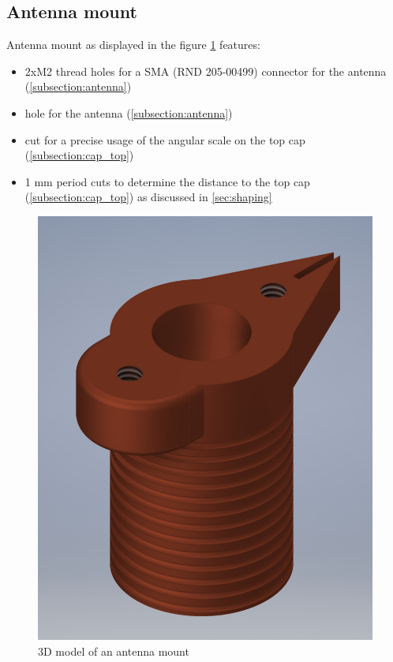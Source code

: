 \clearpage
\subsection{Antenna mount}
\label{subsection:antenna_mount}
Antenna mount as displayed in the figure \ref{fig:antenna_mount} features:
\begin{itemize}
	\item 2xM2 thread holes for a SMA (RND 205-00499) connector for the antenna (\ref{subsection:antenna})
	\item hole for the antenna (\ref{subsection:antenna})
	\item cut for a precise usage of the angular scale on the top cap (\ref{subsection:cap_top})
	\item 1 mm period cuts to determine the distance to the top cap (\ref{subsection:cap_top}) as discussed in \ref{sec:shaping}
\end{itemize}

\begin{figure}[h]
	\centering
	\includegraphics[width=.89\textwidth]{images/antenna_mount_small}
	\caption{3D model of an antenna mount}
	\label{fig:antenna_mount}
\end{figure}

